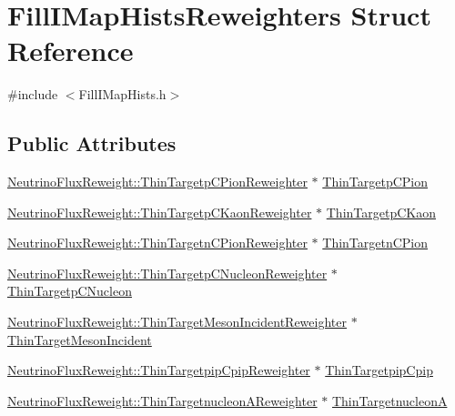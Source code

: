 \hypertarget{struct_fill_i_map_hists_reweighters}{\section{Fill\-I\-Map\-Hists\-Reweighters Struct Reference}
\label{struct_fill_i_map_hists_reweighters}
}


{\ttfamily \#include $<$Fill\-I\-Map\-Hists.\-h$>$}

\subsection*{Public Attributes}
\begin{DoxyCompactItemize}
\item 
\hyperlink{class_neutrino_flux_reweight_1_1_thin_targetp_c_pion_reweighter}{Neutrino\-Flux\-Reweight\-::\-Thin\-Targetp\-C\-Pion\-Reweighter} $\ast$ \hyperlink{struct_fill_i_map_hists_reweighters_a4944bb76f83e1c4b04bc2036bece58c4}{Thin\-Targetp\-C\-Pion}
\item 
\hyperlink{class_neutrino_flux_reweight_1_1_thin_targetp_c_kaon_reweighter}{Neutrino\-Flux\-Reweight\-::\-Thin\-Targetp\-C\-Kaon\-Reweighter} $\ast$ \hyperlink{struct_fill_i_map_hists_reweighters_ac32756201e89e8a12950f40549dc1634}{Thin\-Targetp\-C\-Kaon}
\item 
\hyperlink{class_neutrino_flux_reweight_1_1_thin_targetn_c_pion_reweighter}{Neutrino\-Flux\-Reweight\-::\-Thin\-Targetn\-C\-Pion\-Reweighter} $\ast$ \hyperlink{struct_fill_i_map_hists_reweighters_aa42f582bed0cd276071412ac9f9fe4b2}{Thin\-Targetn\-C\-Pion}
\item 
\hyperlink{class_neutrino_flux_reweight_1_1_thin_targetp_c_nucleon_reweighter}{Neutrino\-Flux\-Reweight\-::\-Thin\-Targetp\-C\-Nucleon\-Reweighter} $\ast$ \hyperlink{struct_fill_i_map_hists_reweighters_a22886c508dd4fd607d4b0335fe3df511}{Thin\-Targetp\-C\-Nucleon}
\item 
\hyperlink{class_neutrino_flux_reweight_1_1_thin_target_meson_incident_reweighter}{Neutrino\-Flux\-Reweight\-::\-Thin\-Target\-Meson\-Incident\-Reweighter} $\ast$ \hyperlink{struct_fill_i_map_hists_reweighters_af3c5d3cde96d514088efffd7dc99dfeb}{Thin\-Target\-Meson\-Incident}
\item 
\hyperlink{class_neutrino_flux_reweight_1_1_thin_targetpip_cpip_reweighter}{Neutrino\-Flux\-Reweight\-::\-Thin\-Targetpip\-Cpip\-Reweighter} $\ast$ \hyperlink{struct_fill_i_map_hists_reweighters_a53fad838dba1cadd89a081a60022e902}{Thin\-Targetpip\-Cpip}
\item 
\hyperlink{class_neutrino_flux_reweight_1_1_thin_targetnucleon_a_reweighter}{Neutrino\-Flux\-Reweight\-::\-Thin\-Targetnucleon\-A\-Reweighter} $\ast$ \hyperlink{struct_fill_i_map_hists_reweighters_ad01dcf424bc66ff7e4d1147026a96e12}{Thin\-Targetnucleon\-A}
\end{DoxyCompactItemize}


